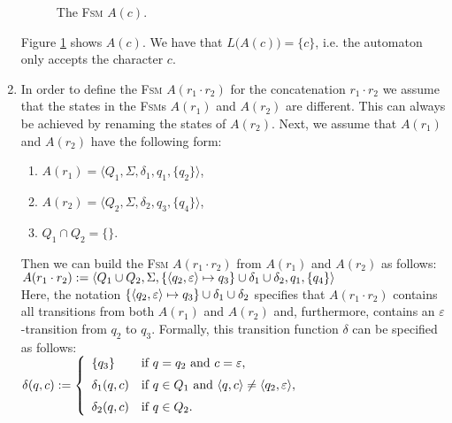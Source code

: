\begin{enumerate}
      \begin{figure}[!ht]
        \centering
      \caption{The \textsc{Fsm} $A(c)$.}
      \label{fig:aChar.eps}
      \end{figure}
      Figure \ref{fig:aChar.eps} shows $A(c)$.
      We have that $L\bigl(A(c)\bigr) = \{c\}$, i.e. the automaton only accepts the character $c$. 
\item In order to define the \textsc{Fsm} $A(r_1 \cdot r_2)$ for the concatenation $r_1 \cdot r_2$ 
      we assume that the states in the \textsc{Fsm}s  $A(r_1)$ and $A(r_2)$ are different. 
      This can always be achieved by renaming the states of $A(r_2)$.
      Next, we assume that $A(r_1)$ and $A(r_2)$ have the following form:
      \begin{enumerate}
      \item $A(r_1) = \langle Q_1, \Sigma, \delta_1, q_1, \{ q_2 \}\rangle$,
      \item $A(r_2) = \langle Q_2, \Sigma, \delta_2, q_3, \{ q_4 \}\rangle$,
      \item $Q_1 \cap Q_2 = \{\}$.
      \end{enumerate}
      Then we can build the \textsc{Fsm} $A(r_1 \cdot r_2)$ from $A(r_1)$ and $A(r_2)$ as follows:
      \\[0.2cm]
      \hspace*{0.8cm}
       $A(r_1 \cdot r_2) := \langle Q_1 \cup Q_2, \Sigma, 
                \{ \pair(q_2,\varepsilon) \mapsto q_3 \} 
                   \cup \delta_1 \cup \delta_2, q_1, \{ q_4 \} \rangle$
      \\[0.2cm]
      Here, the notation $\{ \pair(q_2,\varepsilon) \mapsto q_3 \} \cup \delta_1 \cup \delta_2$ specifies that
      $A(r_1 \cdot r_2)$ contains all transitions from both $A(r_1)$ and $A(r_2)$ and, furthermore,
      contains an $\varepsilon$-transition from $q_2$ to $q_3$.     
      Formally, this transition function  $\delta$ can be specified as follows:
      \\[0.2cm]
      \hspace*{1.3cm}
      $\delta(q,c) := \left\{
      \begin{array}{ll}
        \{ q_3 \}       & \mbox{if $q = q_2$ and $c = \varepsilon$}, \\[0.2cm]
        \delta_1(q, c)  & \mbox{if $q \in Q_1$ and $\pair(q,c) \not= \pair(q_2,\varepsilon)$}, \\[0.2cm]
        \delta_2(q, c)  & \mbox{if $q \in Q_2$.} 
      \end{array}\right.
      $
      \\[0.2cm]



\end{enumerate}
